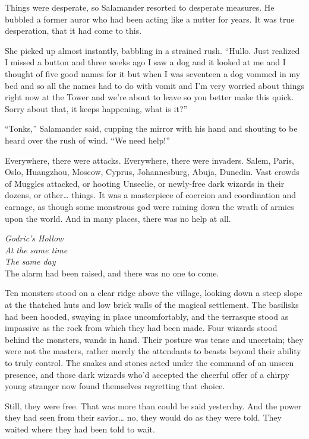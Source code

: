 Things were desperate, so Salamander resorted to desperate measures. He
bubbled a former auror who had been acting like a nutter for years. It
was true desperation, that it had come to this.

She picked up almost instantly, babbling in a strained rush. ``Hullo.
Just realized I missed a button and three weeks ago I saw a dog and it
looked at me and I thought of five good names for it but when I was
seventeen a dog vommed in my bed and so all the names had to do with
vomit and I'm very worried about things right now at the Tower and we're
about to leave so you better make this quick. Sorry about that, it keeps
happening, what is it?''

``Tonks,'' Salamander said, cupping the mirror with his hand and
shouting to be heard over the rush of wind. ``We need help!''

\mybreak

Everywhere, there were attacks. Everywhere, there were invaders. Salem,
Paris, Oslo, Huangzhou, Moscow, Cyprus, Johannesburg, Abuja, Dunedin.
Vast crowds of Muggles attacked, or hooting Unseelie, or newly-free dark
wizards in their dozens, or other\ldots{} things. It was a masterpiece
of coercion and coordination and carnage, as though some monstrous god
were raining down the wrath of armies upon the world. And in many
places, there was no help at all.

\mybreak

\emph{Godric's Hollow}\\
\emph{At the same time}\\
\emph{The same day}\\

The alarm had been raised, and there was no one to come.

Ten monsters stood on a clear ridge above the village, looking down a
steep slope at the thatched huts and low brick walls of the magical
settlement. The basilisks had been hooded, swaying in place
uncomfortably, and the terrasque stood as impassive as the rock from
which they had been made. Four wizards stood behind the monsters, wands
in hand. Their posture was tense and uncertain; they were not the
masters, rather merely the attendants to beasts beyond their ability to
truly control. The snakes and stones acted under the command of an
unseen presence, and those dark wizards who'd accepted the cheerful
offer of a chirpy young stranger now found themselves regretting that
choice.

Still, they were free. That was more than could be said yesterday. And
the power they had seen from their savior\ldots{} no, they would do as
they were told. They waited where they had been told to wait.

